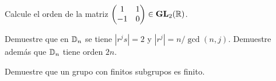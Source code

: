 \begin{exercise}
Calcule el orden de la matriz $\begin{pmatrix}1&1\\-1&0\end{pmatrix}\in\mathbf{GL}_2(\mathbb{R})$. 	
\end{exercise}

\begin{exercise}
Demuestre que en $\mathbb{D}_n$ se tiene $|r^js|=2$ y $|r^j|=n/\gcd(n,j)$. Demuestre además que $\mathbb{D}_n$ tiene orden $2n$. 	
\end{exercise}

\begin{exercise}
		Demuestre que un grupo con finitos subgrupos es finito. 	
\end{exercise}

